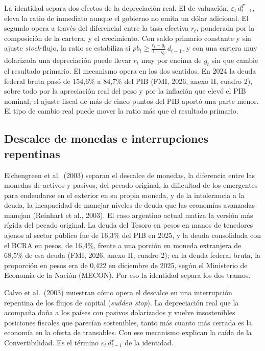 La identidad separa dos efectos de la depreciación real. El de
valuación, \(\varepsilon_t\, d^F_{t-1}\), eleva la ratio de inmediato
aunque el gobierno no emita un dólar adicional. El segundo opera a
través del diferencial entre la tasa efectiva \(r_t\), ponderada por la
composición de la cartera, y el crecimiento. Con saldo primario
constante y sin ajuste \emph{stock}-flujo, la ratio se estabiliza si
\(pb_t \ge \frac{r_t - g_t}{1+g_t}\, d_{t-1}\), y con una cartera muy
dolarizada una depreciación puede llevar \(r_t\) muy por encima de
\(g_t\) sin que cambie el resultado primario. El mecanismo opera en los
dos sentidos. En 2024 la deuda federal bruta pasó de 154,6\% a 84,7\%
del PIB (FMI, 2026, anexo II, cuadro 2), sobre todo por la apreciación
real del peso y por la inflación que elevó el PIB nominal; el ajuste
fiscal de más de cinco puntos del PIB aportó una parte menor. El tipo de
cambio real puede mover la ratio más que el resultado primario.

\subsection{Descalce de monedas e interrupciones repentinas}

Eichengreen et al.~(2003) separan el descalce de monedas, la diferencia
entre las monedas de activos y pasivos, del pecado original, la
dificultad de los emergentes para endeudarse en el exterior en su propia
moneda, y de la intolerancia a la deuda, la incapacidad de manejar
niveles de deuda que las economías avanzadas manejan (Reinhart et al.,
2003). El caso argentino actual matiza la versión más rígida del pecado
original. La deuda del Tesoro en pesos en manos de tenedores ajenos al
sector público fue de 16,3\% del PIB en 2025, y la deuda consolidada con
el BCRA en pesos, de 16,4\%, frente a una porción en moneda extranjera
de 68,5\% de esa deuda (FMI, 2026, anexo II, cuadro 2); en la deuda
federal bruta, la proporción en pesos era de 0,422 en diciembre de 2025,
según el Ministerio de Economía de la Nación (MECON). Por eso la
identidad separa los dos tramos.

Calvo et al.~(2003) muestran cómo opera el descalce en una interrupción
repentina de los flujos de capital (\emph{sudden stop}). La depreciación
real que la acompaña daña a los países con pasivos dolarizados y vuelve
insostenibles posiciones fiscales que parecían sostenibles, tanto más
cuanto más cerrada es la economía en la oferta de transables. Con ese
mecanismo explican la caída de la Convertibilidad. Es el término
\(\varepsilon_t\, d^F_{t-1}\) de la identidad.

